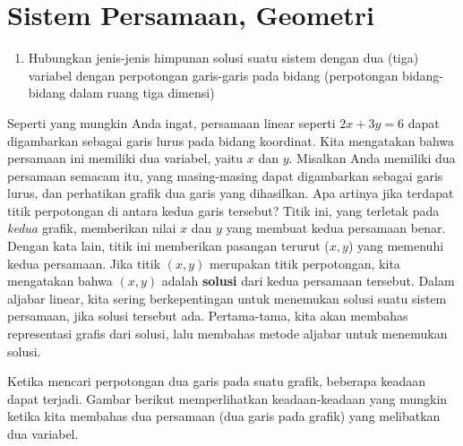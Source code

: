 \section{Sistem Persamaan, Geometri}

\begin{outcome}
\begin{enumerate}
\item[A.] Hubungkan jenis-jenis himpunan solusi suatu sistem dengan dua (tiga)
variabel dengan perpotongan garis-garis pada bidang (perpotongan
bidang-bidang dalam ruang tiga dimensi)
\end{enumerate}
\end{outcome}

Seperti yang mungkin Anda ingat, persamaan linear seperti $2x+3y=6$ dapat digambarkan sebagai
garis lurus pada bidang koordinat. Kita mengatakan bahwa persamaan ini memiliki
dua variabel, yaitu $x$ dan $y$. Misalkan Anda memiliki dua
persamaan semacam itu, yang masing-masing dapat digambarkan sebagai garis lurus, dan perhatikan
grafik dua garis yang dihasilkan. Apa artinya jika terdapat
titik perpotongan di antara kedua garis tersebut? Titik ini, yang terletak pada
{\em kedua \em} grafik, memberikan nilai $x$ dan $y$ yang membuat kedua
persamaan benar. Dengan kata lain, titik ini memberikan pasangan terurut
($x,y$) yang memenuhi kedua persamaan. Jika titik $\left( x, y
\right)$ merupakan titik perpotongan, kita mengatakan bahwa $\left( x, y \right)$
adalah \textbf{solusi} dari kedua persamaan tersebut. Dalam aljabar linear, kita
sering berkepentingan untuk menemukan solusi suatu sistem
persamaan, jika solusi tersebut ada. Pertama-tama, kita akan membahas representasi
grafis dari solusi, lalu membahas metode aljabar untuk menemukan solusi.

Ketika mencari perpotongan dua garis pada suatu grafik, beberapa keadaan dapat terjadi. Gambar berikut memperlihatkan keadaan-keadaan yang mungkin
ketika kita membahas dua persamaan (dua garis pada grafik) yang melibatkan dua variabel.

\par{}\label{fig:systemsofequationsGeometry-tikz01}%


